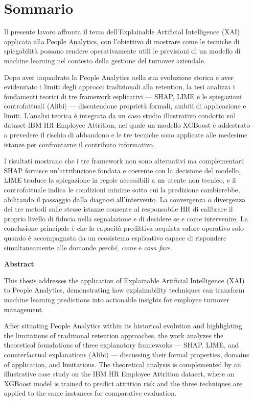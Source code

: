 \chapter*{Sommario}

Il presente lavoro affronta il tema dell'Explainable Artificial Intelligence (XAI) applicata alla People Analytics, con l'obiettivo di mostrare come le tecniche di spiegabilità possano rendere operativamente utili le previsioni di un modello di machine learning nel contesto della gestione del turnover aziendale.

Dopo aver inquadrato la People Analytics nella sua evoluzione storica e aver evidenziato i limiti degli approcci tradizionali alla retention, la tesi analizza i fondamenti teorici di tre framework esplicativi --- SHAP, LIME e le spiegazioni controfattuali (Alibi) --- discutendone proprietà formali, ambiti di applicazione e limiti. L'analisi teorica è integrata da un caso studio illustrativo condotto sul dataset IBM HR Employee Attrition, nel quale un modello XGBoost è addestrato a prevedere il rischio di abbandono e le tre tecniche sono applicate alle medesime istanze per confrontarne il contributo informativo.

I risultati mostrano che i tre framework non sono alternativi ma complementari: SHAP fornisce un'attribuzione fondata e coerente con la decisione del modello, LIME traduce la spiegazione in regole accessibili a un utente non tecnico, e il controfattuale indica le condizioni minime sotto cui la predizione cambierebbe, abilitando il passaggio dalla diagnosi all'intervento. La convergenza o divergenza dei tre metodi sulle stesse istanze consente al responsabile HR di calibrare il proprio livello di fiducia nella segnalazione e di decidere se e come intervenire. La conclusione principale è che la capacità predittiva acquista valore operativo solo quando è accompagnata da un ecosistema esplicativo capace di rispondere simultaneamente alle domande \emph{perché}, \emph{come} e \emph{cosa fare}.

\bigskip
\noindent\textbf{Abstract}

\bigskip
This thesis addresses the application of Explainable Artificial Intelligence (XAI) to People Analytics, demonstrating how explainability techniques can transform machine learning predictions into actionable insights for employee turnover management.

After situating People Analytics within its historical evolution and highlighting the limitations of traditional retention approaches, the work analyzes the theoretical foundations of three explanatory frameworks --- SHAP, LIME, and counterfactual explanations (Alibi) --- discussing their formal properties, domains of application, and limitations. The theoretical analysis is complemented by an illustrative case study on the IBM HR Employee Attrition dataset, where an XGBoost model is trained to predict attrition risk and the three techniques are applied to the same instances for comparative evaluation.

